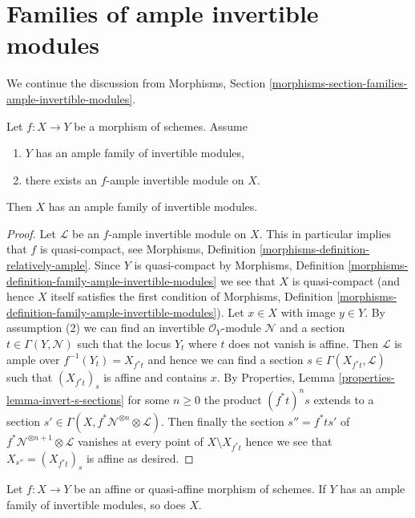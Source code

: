 \section{Families of ample invertible modules}
\label{section-families-ample-invertible-modules}

\noindent
We continue the discussion from
Morphisms, Section \ref{morphisms-section-families-ample-invertible-modules}.

\begin{lemma}
\label{lemma-ample-family-ample-relative}
Let $f : X \to Y$ be a morphism of schemes. Assume
\begin{enumerate}
\item $Y$ has an ample family of invertible modules,
\item there exists an $f$-ample invertible module on $X$.
\end{enumerate}
Then $X$ has an ample family of invertible modules.
\end{lemma}

\begin{proof}
Let $\mathcal{L}$ be an $f$-ample invertible module on $X$.
This in particular implies that $f$ is quasi-compact, see
Morphisms, Definition \ref{morphisms-definition-relatively-ample}.
Since $Y$ is quasi-compact by Morphisms, Definition
\ref{morphisms-definition-family-ample-invertible-modules}
we see that $X$ is quasi-compact (and hence $X$ itself satisfies the
first condition of  Morphisms, Definition
\ref{morphisms-definition-family-ample-invertible-modules}).
Let $x \in X$ with image $y \in Y$. By assumption (2) we can
find an invertible $\mathcal{O}_Y$-module $\mathcal{N}$ and a section
$t \in \Gamma(Y, \mathcal{N})$ such that the locus $Y_t$ where $t$
does not vanish is affine. Then $\mathcal{L}$ is ample over
$f^{-1}(Y_t) = X_{f^*t}$ and hence we can find a section
$s \in \Gamma(X_{f^*t}, \mathcal{L})$ such that $(X_{f^*t})_s$ is affine
and contains $x$. By
Properties, Lemma \ref{properties-lemma-invert-s-sections}
for some $n \geq 0$ the product $(f^*t)^n s$ extends to a section
$s' \in \Gamma(X, f^*\mathcal{N}^{\otimes n} \otimes \mathcal{L})$.
Then finally the section $s'' = f^* ts'$ of
$f^*\mathcal{N}^{\otimes n + 1} \otimes \mathcal{L}$
vanishes at every point of $X \setminus X_{f^*t}$ hence
we see that $X_{s''} = (X_{f^*t})_s$ is affine as desired.
\end{proof}

\begin{lemma}
\label{lemma-resolution-property-goes-up-affine}
Let $f : X \to Y$ be an affine or quasi-affine morphism of schemes.
If $Y$ has an ample family of invertible modules, so does $X$.
\end{lemma}

